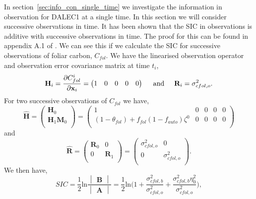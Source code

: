 \documentclass[11pt]{article}
\begin{document}
In section~\ref{sec:info_con_single_time} we investigate the information in observation for DALEC1 at a single time. In this section we will consider successive observations in time. It has been shown that the SIC in observations is additive with successive observations in time. The proof for this can be found in appendix A.1 of \citet{Fowler2012}. We can see this if we calculate the SIC for successive observations of foliar carbon, \(C_{fol}\). We have the linearised observation operator and observation error covariance matrix at time $t_i$,
\begin{equation}
\mathbf{H}_{i} = \frac{\partial C_{fol}^{i}}{\partial \textbf{x}_i} = \begin{pmatrix}
1 & 0 & 0 & 0 & 0
\end{pmatrix}
\hspace{5mm} \text{and} \hspace{5mm}
\mathbf{R}_i=\sigma_{cfol,o}^{2}.
\end{equation}
For two successive observations of \(C_{fol}\) we have,
\begin{equation}
\hat{\mathbf{H}}=
\begin{pmatrix}
\mathbf{H}_0 \\
\mathbf{H}_1\mathbf{M}_0\\
\end{pmatrix}
=
\begin{pmatrix}
1 & 0 & 0 & 0 & 0 \\
(1-\theta_{fol})+f_{fol}(1-f_{auto})\zeta^0 & 0 & 0 & 0 & 0\\
\end{pmatrix}
\end{equation}
and
\begin{equation}
\hat{\mathbf{R}}=
\begin{pmatrix}
\mathbf{R}_0 & 0  \\
0 & \mathbf{R}_1  \\
\end{pmatrix}
=
\begin{pmatrix}
\sigma_{cfol,o}^{2} & 0  \\
0 & \sigma_{cfol,o}^{2}  \\
\end{pmatrix}.
\end{equation}
We then have,
\begin{equation}
SIC = \frac{1}{2}\text{ln}\frac{\begin{vmatrix} \mathbf{B} \end{vmatrix}}{\begin{vmatrix} \mathbf{A} \end{vmatrix}} =\frac{1}{2}\text{ln} \bigg(1+\frac{\sigma_{cfol,b}^{2}}{\sigma_{cfol,o}^{2}}+\frac{\sigma_{cfol,b}^{2}\eta_0^{2}}{\sigma_{cfol,o}^{2}} \bigg), \label{eq:sic_2cfol}
\end{equation}
\end{document}
